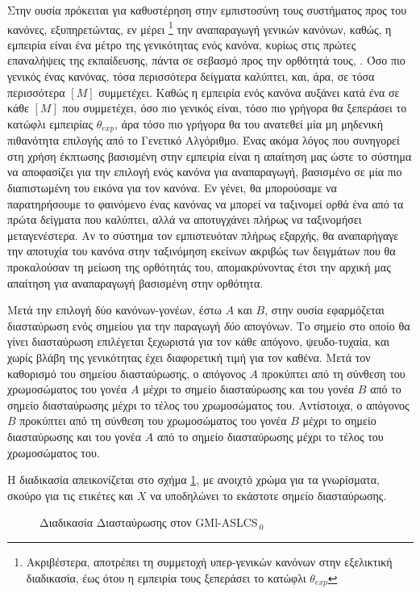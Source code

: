 Στην ουσία πρόκειται για καθυστέρηση στην εμπιστοσύνη τους συστήματος προς του κανόνες, εξυπηρετώντας, εν μέρει
\footnote{Ακριβέστερα, αποτρέπει τη συμμετοχή υπερ-γενικών κανόνων στην εξελικτική διαδικασία, έως ότου η εμπειρία τους ξεπεράσει το κατώφλι $\theta_{exp}$}
την αναπαραγωγή γενικών κανόνων, καθώς, η εμπειρία είναι ένα μέτρο της γενικότητας ενός κανόνα, κυρίως στις πρώτες επαναλήψεις της εκπαίδευσης, πάντα σε σεβασμό προς την ορθότητά τους, . Όσο πιο γενικός ένας κανόνας, τόσα περισσότερα δείγματα καλύπτει, και, άρα, σε τόσα περισσότερα $[M]$ συμμετέχει. Καθώς η εμπειρία ενός κανόνα αυξάνει κατά ένα σε κάθε $[M]$ που συμμετέχει, όσο πιο γενικός είναι, τόσο πιο γρήγορα θα ξεπεράσει το κατώφλι εμπειρίας $\theta_{exp}$, άρα τόσο πιο γρήγορα θα του ανατεθεί μία μη μηδενική πιθανότητα επιλογής από το Γενετικό Αλγόριθμο. Ένας ακόμα λόγος που συνηγορεί στη χρήση έκπτωσης βασισμένη στην εμπειρία είναι η απαίτηση μας ώστε το σύστημα να αποφασίζει για την επιλογή ενός κανόνα για αναπαραγωγή, βασισμένο σε μία πιο διαπιστωμένη του εικόνα για τον κανόνα. Εν γένει, θα μπορούσαμε να παρατηρήσουμε το φαινόμενο ένας κανόνας να μπορεί να ταξινομεί ορθά ένα από τα πρώτα δείγματα που καλύπτει, αλλά να αποτυγχάνει πλήρως να ταξινομήσει μεταγενέστερα. Αν το σύστημα τον εμπιστευόταν πλήρως εξαρχής, θα αναπαρήγαγε την αποτυχία του κανόνα στην ταξινόμηση εκείνων ακριβώς των δειγμάτων που θα προκαλούσαν τη μείωση της ορθότητάς του, απομακρύνοντας έτσι την αρχική μας απαίτηση για αναπαραγωγή βασισμένη στην ορθότητα.

Μετά την επιλογή δύο κανόνων-γονέων, έστω $A$ και $B$, στην ουσία εφαρμόζεται διασταύρωση ενός σημείου για την παραγωγή \emph{δύο} απογόνων. Το σημείο στο οποίο θα γίνει διασταύρωση επιλέγεται ξεχωριστά για τον κάθε απόγονο, ψευδο-τυχαία, και χωρίς βλάβη της γενικότητας έχει διαφορετική τιμή για τον καθένα. Μετά τον καθορισμό του σημείου διασταύρωσης, ο απόγονος $A$ προκύπτει από τη σύνθεση του χρωμοσώματος του γονέα $A$ μέχρι το σημείο διασταύρωσης και του γονέα $B$ από το σημείο διασταύρωσης μέχρι το τέλος του χρωμοσώματος του. Αντίστοιχα, ο απόγονος $B$ προκύπτει από τη σύνθεση του χρωμοσώματος του γονέα $B$ μέχρι το σημείο διασταύρωσης και του γονέα $A$ από το σημείο διασταύρωσης μέχρι το τέλος του χρωμοσώματος του.

Η διαδικασία απεικονίζεται στο σχήμα \ref{fig:singlePointCrossoverOffsprings}, με ανοιχτό χρώμα για τα γνωρίσματα, σκούρο για τις ετικέτες και $X$ να υποδηλώνει το εκάστοτε σημείο διασταύρωσης.


\begin{figure}[h!]
\centering
  
  \caption{Διαδικασία Διασταύρωσης στον GMl-ASLCS$_{\:0}$}
  \label{fig:singlePointCrossoverOffsprings}
\end{figure}

